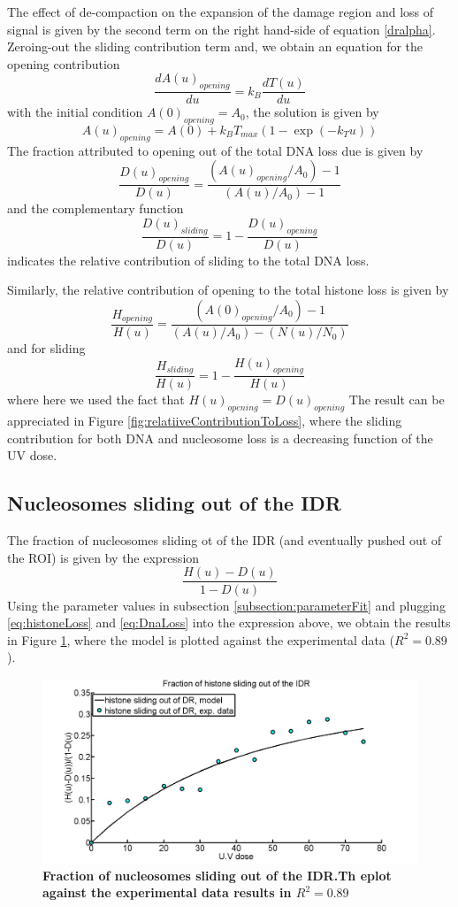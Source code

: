 \documentclass[12pt]{article}
\begin{document}
The effect of de-compaction on the expansion of the damage region and loss of signal is given by the second term on the right hand-side of equation \ref{dralpha}. Zeroing-out the sliding contribution term and,  we obtain an equation for the opening contribution 
\begin{equation*}
\frac{dA(u)_{opening}}{du}=k_B\frac{dT(u)}{du}
\end{equation*}
with the initial condition $A(0)_{opening}=A_0$, the solution is given by
\begin{equation}
A(u)_{opening}= A(0)+k_BT_{max}(1-\exp(-k_Tu))
\end{equation}
The fraction attributed to opening out of the total DNA loss due is given by 
\begin{equation}\label{eq:openingContributionDNA}
\frac{D(u)_{opening}}{D(u)}=\frac{\left(A(u)_{opening}/A_0\right)-1}{\left(A(u)/A_0\right) -1}
\end{equation}
and the complementary function 
\begin{equation}\label{eq:slidingContributionDNA}
\frac{D(u)_{sliding}}{D(u)}=1-\frac{D(u)_{opening}}{D(u)}
\end{equation}
indicates the relative contribution of sliding to the total DNA loss. 

Similarly, the relative contribution of opening to the total histone loss is given by 
\begin{equation}\label{eq:openingContributionHistones}
\frac{H_{opening}}{H(u)} =\frac{\left(A(0)_{opening}/A_0\right)-1}{(A(u)/A_0)-(N(u)/N_0)}
\end{equation}
and for sliding
\begin{equation}\label{eq:slidingContributionHistones}
\frac{H_{sliding}}{H(u)} = 1-\frac{H(u)_{opening}}{H(u)} 
\end{equation}
where here we used the fact that $H(u)_{opening}=D(u)_{opening}$
The result can be appreciated in Figure \ref{fig:relatiiveContributionToLoss}, where the sliding contribution for both DNA and nucleosome loss is a decreasing function of the UV dose. 

\subsection{Nucleosomes sliding out of the IDR}
The fraction of nucleosomes sliding ot of the IDR (and eventually pushed out of the ROI) is given by the expression 
\begin{equation}
\frac{H(u)-D(u)}{1-D(u)}
\end{equation}
Using the parameter values in subsection \ref{subsection:parameterFit} and plugging \ref{eq:histoneLoss} and \ref{eq:DnaLoss} into the expression above, we obtain the results in Figure \ref{fig:fractionSlidingOutOfIDR}, where the model is plotted against the experimental data ($R^2=0.89$). 

\begin{figure}[H]
\centering
\includegraphics[width=0.5\linewidth, height=0.3\textheight]{fractionSlidingOutOfIDR}
\caption{\textbf{Fraction of nucleosomes sliding out of the IDR.Th eplot against the experimental data results in $R^2=0.89$ }}
\label{fig:fractionSlidingOutOfIDR}
\end{figure}
\end{document}
